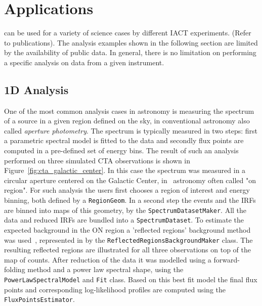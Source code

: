 \documentclass[traditabstract, longauth]{aa}
\newcommand{\code}[1]{\texttt{#1}}
\begin{document}


\section{Applications}
\label{sec:applications}

\gammapy can be used for a variety of science cases by different IACT
experiments. (Refer to publications). The analysis examples shown in
the following section are limited by the availability
of public data. In general, there is no limitation on performing a specific analysis
on data from a given instrument.



\subsection{1D Analysis}
\label{ssec:1d-analysis}
One of the most common analysis cases in \gammaray astronomy is measuring the
spectrum of a source in a given region defined on the sky, in conventional
astronomy also called \textit{aperture photometry}. The spectrum is typically measured
in two steps: first a parametric spectral model is fitted to the data and
secondly flux points are computed in a pre-defined set of energy bins. The
result of such an analysis performed on three simulated CTA observations is
shown in Figure~\ref{fig:cta_galactic_center}. In this case the spectrum was
measured in a circular aperture centered on the Galactic Center, in
\gammaray~astronomy often called "on region". For such analysis the users first
chooses a region of interest and energy binning, both defined by a
\code{RegionGeom}. In a second step the events and the IRFs are binned
into maps of this geometry, by the \code{SpectrumDatasetMaker}. All the data and
reduced IRFs are bundled into a \code{SpectrumDataset}. To estimate
the expected background in the ON region a 'reflected regions' background
method was used~\cite{Berge07}, represented in \gammapy by the
\code{ReflectedRegionsBackgroundMaker} class. The resulting reflected regions are
illustrated for all three observations on top of the map of counts. After
reduction of the data it was modelled using a forward-folding method and a
power law spectral shape, using the \code{PowerLawSpectralModel} and \code{Fit} class.
Based on this best fit model the final flux points and corresponding
log-likelihood profiles are computed using the \code{FluxPointsEstimator}.
\end{document}
